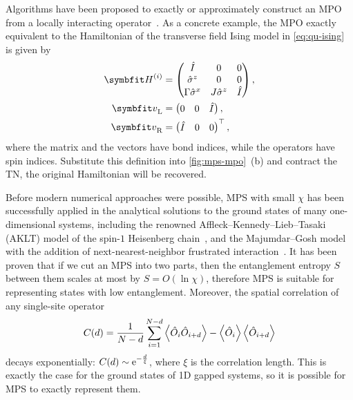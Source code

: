 Algorithms have been proposed to exactly or approximately construct an MPO from a locally interacting operator~\cite{crosswhite2008finite, hubig2017generic, paeckel2017automated}. As a concrete example, the MPO exactly equivalent to the Hamiltonian of the transverse field Ising model in \cref{eq:qu-ising} is given by
\begin{align}
\mH^{(i)} &= \begin{pmatrix}
\hat{I} & 0 & 0 \\
\hat{\sigma}^z & 0 & 0 \\
\Gamma \hat{\sigma}^x & J \hat{\sigma}^z & \hat{I}
\end{pmatrix}, \\
\vv_\text{L} &= \begin{pmatrix} 0 & 0 & \hat{I} \end{pmatrix}, \\
\vv_\text{R} &= \begin{pmatrix} \hat{I} & 0 & 0 \end{pmatrix}^\transpose,
\end{align}
where the matrix and the vectors have bond indices, while the operators have spin indices. Substitute this definition into \cref{fig:mps-mpo}~(b) and contract the TN, the original Hamiltonian will be recovered.

Before modern numerical approaches were possible, MPS with small $\chi$ has been successfully applied in the analytical solutions to the ground states of many one-dimensional systems, including the renowned Affleck--Kennedy--Lieb--Tasaki (AKLT) model of the spin-$1$ Heisenberg chain~\cite{affleck1987rigorous, klumper1991equivalence, fannes1992finitely}, and the Majumdar--Gosh model with the addition of next-nearest-neighbor frustrated interaction~\cite{majumdar1969next}. It has been proven that if we cut an MPS into two parts, then the entanglement entropy $S$ between them scales at most by $S = O(\ln \chi)$, therefore MPS is suitable for representing states with low entanglement\cite{verstraete2008matrix}. Moreover, the spatial correlation of any single-site operator
\begin{equation}
C(d) = \frac{1}{N - d} \sum_{i = 1}^{N - d} \ev{\hat{O}_i \hat{O}_{i + d}} - \ev{\hat{O}_i} \ev{\hat{O}_{i + d}}
\label{eq:corr-d}
\end{equation}
decays exponentially: $C(d) \sim \mathrm{e}^{-\frac{d}{\xi}}$, where $\xi$ is the correlation length. This is exactly the case for the ground states of 1D gapped systems, so it is possible for MPS to exactly represent them.

